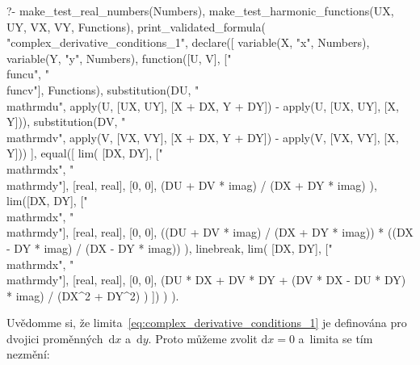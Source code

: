 \begin{prolog}
?-	make_test_real_numbers(Numbers),
	make_test_harmonic_functions(UX, UY, VX, VY, Functions),
	print_validated_formula(
		"complex_derivative_conditions_1",
		declare([
			variable(X, "x", Numbers),
			variable(Y, "y", Numbers),
			function([U, V], ["\\func{u}", "\\func{v}"], Functions), 
			substitution(DU, "\\mathrm{d}u", apply(U, [UX, UY], [X + DX, Y + DY]) - apply(U, [UX, UY], [X, Y])),
			substitution(DV, "\\mathrm{d}v", apply(V, [VX, VY], [X + DX, Y + DY]) - apply(V, [VX, VY], [X, Y]))
		],
			equal([
				lim(
					[DX, DY], ["\\mathrm{d}x", "\\mathrm{d}y"], [real, real], [0, 0],
					(DU + DV * imag) / (DX + DY * imag)
				),
				lim([DX, DY], ["\\mathrm{d}x", "\\mathrm{d}y"], [real, real], [0, 0],
					((DU + DV * imag) / (DX + DY * imag)) * ((DX - DY * imag) / (DX - DY * imag))	
				),
				linebreak,
				lim(
					[DX, DY], ["\\mathrm{d}x", "\\mathrm{d}y"], [real, real], [0, 0],
					(DU * DX + DV * DY + (DV * DX - DU * DY) * imag) / (DX^2 + DY^2)
				)
			])
		)
	).
\end{prolog}

Uvědomme si, že limita~\eqref{eq:complex_derivative_conditions_1} je definována pro dvojici proměnných~\(\mathrm{d}x\) a~\(\mathrm{d}y\). Proto můžeme zvolit \(\mathrm{d}x = 0\) a~limita se tím nezmění:

